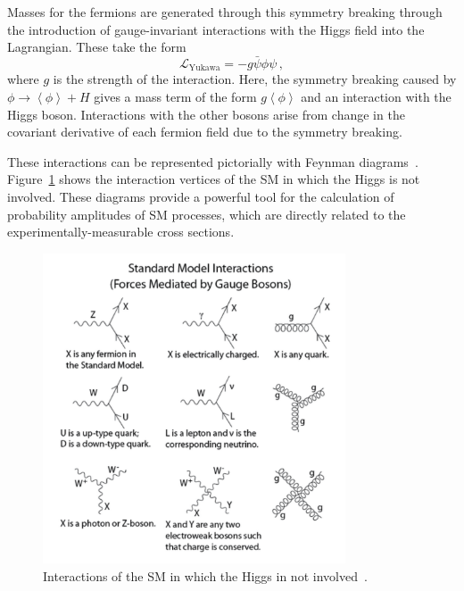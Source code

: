Masses for the fermions are generated through this symmetry breaking through the introduction of
gauge-invariant interactions with the Higgs field into the Lagrangian. These take the form
\begin{equation}
\mathcal{L}_{\text{Yukawa}} = -g \bar{\psi}\phi\psi \,,
\end{equation}
where $g$ is the strength of the interaction. Here, the symmetry breaking caused by
$\phi \rightarrow \left\langle \phi \right\rangle + H$ gives a mass term of the form
$g \left\langle \phi \right\rangle$ and an interaction with the Higgs boson. Interactions with the
other bosons arise from change in the covariant derivative of each fermion field due to the
symmetry breaking.

These interactions can be represented pictorially with
Feynman diagrams~\cite{1948.Feynman.path-integral-QM}. Figure~\ref{fig:nonhiggsint} shows the
interaction vertices of the SM in which the Higgs is not involved. These diagrams provide a powerful
tool for the calculation of probability amplitudes of SM processes, which are directly related to the
experimentally-measurable cross sections.

\begin{figure}[ht]
 \begin{center}
    \includegraphics[width=0.80\textwidth]{figures/intro/Standard_Model_Feynman_Diagram_Vertices.pdf}
      \end{center}
\caption{Interactions of the SM in which the Higgs in not involved~\cite{SMinteractions_nonhiggs}.}
\label{fig:nonhiggsint}
\end{figure}

